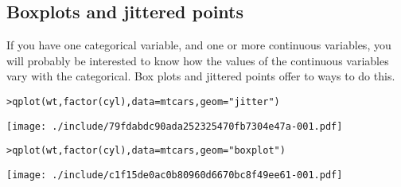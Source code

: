 % 
% 
% 
% 

\subsection{Boxplots and jittered points}\label{sub:boxplot}

If you have one categorical variable, and one or more continuous variables, you will probably be interested to know how the values of the continuous variables vary with the categorical.  Box plots and jittered points offer to ways to do this.  

\begin{alltt}
> qplot(wt, factor(cyl), data = mtcars, geom = "jitter")
\end{alltt}
\texttt{[image: ./include/79fdabdc90ada252325470fb7304e47a-001.pdf]}
\begin{alltt}

> qplot(wt, factor(cyl), data = mtcars, geom = "boxplot")
\end{alltt}
\texttt{[image: ./include/c1f15de0ac0b80960d6670bc8f49ee61-001.pdf]}
\begin{alltt}

\end{alltt}

